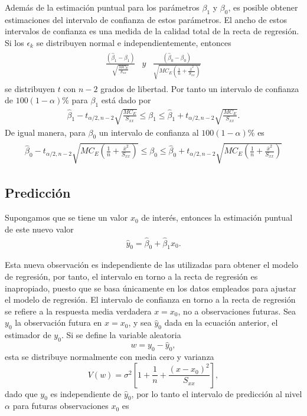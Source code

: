 \documentclass[12pt]{article}
\begin{document}
Adem\'as de la estimaci\'on puntual para los par\'ametros $\beta_{1}$ y $\beta_{0}$, es posible obtener estimaciones del intervalo de confianza de estos par\'ametros. El ancho de estos intervalos de confianza es una medida de la calidad total de la recta de regresi\'on. Si los $\epsilon_{k}$ se distribuyen normal e independientemente, entonces
\begin{eqnarray*}
\begin{array}{ccc}
\frac{\left(\hat{\beta}_{1}-\beta_{1}\right)}{\sqrt{\frac{MC_{E}}{S_{xx}}}}&y &\frac{\left(\hat{\beta}_{0}-\beta_{0}\right)}{\sqrt{MC_{E}\left(\frac{1}{n}+\frac{\overline{x}^{2}}{S_{xx}}\right)}}
\end{array}
\end{eqnarray*}
se distribuyen $t$ con $n-2$ grados de libertad. Por tanto un intervalo de confianza de $100\left(1-\alpha\right)\%$ para $\beta_{1}$ est\'a dado por
\begin{eqnarray*}
\hat{\beta}_{1}-t_{\alpha/2,n-2}\sqrt{\frac{MC_{E}}{S_{xx}}}\leq \beta_{1}\leq\hat{\beta}_{1}+t_{\alpha/2,n-2}\sqrt{\frac{MC_{E}}{S_{xx}}}.
\end{eqnarray*}
De igual manera, para $\beta_{0}$ un intervalo de confianza al $100\left(1-\alpha\right)\%$ es
\small{
\begin{eqnarray*}
\begin{array}{l}
\hat{\beta}_{0}-t_{\alpha/2,n-2}\sqrt{MC_{E}\left(\frac{1}{n}+\frac{\overline{x}^{2}}{S_{xx}}\right)}\leq\beta_{0}\leq\hat{\beta}_{0}+t_{\alpha/2,n-2}\sqrt{MC_{E}\left(\frac{1}{n}+\frac{\overline{x}^{2}}{S_{xx}}\right)}
\end{array}
\end{eqnarray*}}

\subsection{Predicci\'on}

Supongamos que se tiene un valor $x_{0}$ de inter\'es, entonces la estimaci\'on puntual de este nuevo valor
\begin{eqnarray*}
\hat{y}_{0}=\hat{\beta}_{0}+\hat{\beta}_{1}x_{0}.
\end{eqnarray*}

Esta nueva observaci\'on es independiente de las utilizadas para obtener el modelo de regresi\'on, por tanto, el intervalo en torno a la recta de regresi\'on es inapropiado, puesto que se basa \'unicamente en los datos empleados para ajustar el modelo de regresi\'on. El intervalo de confianza en torno a la recta de regresi\'on se refiere a la respuesta media verdadera $x=x_{0}$, no a observaciones futuras. Sea $y_{0}$ la observaci\'on futura en $x=x_{0}$, y sea $\hat{y}_{0}$ dada en la ecuaci\'on anterior, el estimador de $y_{0}$. Si se define la variable aleatoria $$w=y_{0}-\hat{y}_{0},$$ esta se distribuye normalmente con media cero y varianza $$V\left(w\right)=\sigma^{2}\left[1+\frac{1}{n}+\frac{\left(x-x_{0}\right)^2}{S_{xx}}\right],$$ dado que $y_{0}$ es independiente de $\hat{y}_{0}$, por lo tanto el intervalo de predicci\'on al nivel $\alpha$ para futuras observaciones $x_{0}$ es
\end{document}
